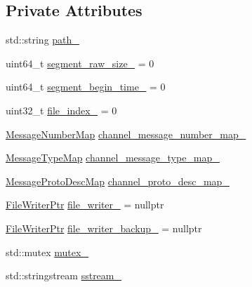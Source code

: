 \subsection*{Private Attributes}
\begin{DoxyCompactItemize}
\item 
std\-::string \hyperlink{classapollo_1_1cyber_1_1record_1_1RecordWriter_a2dd230e28b838aef212051c69d1959b5}{path\-\_\-}
\item 
uint64\-\_\-t \hyperlink{classapollo_1_1cyber_1_1record_1_1RecordWriter_a93dde89dc680e3e6bddf15ee9a798619}{segment\-\_\-raw\-\_\-size\-\_\-} = 0
\item 
uint64\-\_\-t \hyperlink{classapollo_1_1cyber_1_1record_1_1RecordWriter_aeb5e15610f58a30bf82b7cc72ad0a9e8}{segment\-\_\-begin\-\_\-time\-\_\-} = 0
\item 
uint32\-\_\-t \hyperlink{classapollo_1_1cyber_1_1record_1_1RecordWriter_af5094adbd45ce47753dff6b5fc0a79c8}{file\-\_\-index\-\_\-} = 0
\item 
\hyperlink{classapollo_1_1cyber_1_1record_1_1RecordWriter_a2eee5f400e4db03ec9101258d8e819ab}{Message\-Number\-Map} \hyperlink{classapollo_1_1cyber_1_1record_1_1RecordWriter_af60d36f6e755729d5b0c49c4900a75c2}{channel\-\_\-message\-\_\-number\-\_\-map\-\_\-}
\item 
\hyperlink{classapollo_1_1cyber_1_1record_1_1RecordWriter_a199b00d29dde82c7a061b4ee2b6204d3}{Message\-Type\-Map} \hyperlink{classapollo_1_1cyber_1_1record_1_1RecordWriter_a3697130c4b69f46f1420f33b238a36ea}{channel\-\_\-message\-\_\-type\-\_\-map\-\_\-}
\item 
\hyperlink{classapollo_1_1cyber_1_1record_1_1RecordWriter_a19879e77c64a35d8e8d49d39798c25cb}{Message\-Proto\-Desc\-Map} \hyperlink{classapollo_1_1cyber_1_1record_1_1RecordWriter_a9f5fde8dcd26af2dff253a0b95e15211}{channel\-\_\-proto\-\_\-desc\-\_\-map\-\_\-}
\item 
\hyperlink{classapollo_1_1cyber_1_1record_1_1RecordWriter_a9711b0e51bbbd4dbe54e44c3d1fbd9da}{File\-Writer\-Ptr} \hyperlink{classapollo_1_1cyber_1_1record_1_1RecordWriter_aa2df27a2d2944227aa8f38593a018c2e}{file\-\_\-writer\-\_\-} = nullptr
\item 
\hyperlink{classapollo_1_1cyber_1_1record_1_1RecordWriter_a9711b0e51bbbd4dbe54e44c3d1fbd9da}{File\-Writer\-Ptr} \hyperlink{classapollo_1_1cyber_1_1record_1_1RecordWriter_a12e4edaffd51705cd928e1a9925303c5}{file\-\_\-writer\-\_\-backup\-\_\-} = nullptr
\item 
std\-::mutex \hyperlink{classapollo_1_1cyber_1_1record_1_1RecordWriter_ab309369671e53408b88782b68f897be0}{mutex\-\_\-}
\item 
std\-::stringstream \hyperlink{classapollo_1_1cyber_1_1record_1_1RecordWriter_a6ebe2f54d4185936811d045e0135b513}{sstream\-\_\-}
\end{DoxyCompactItemize}
